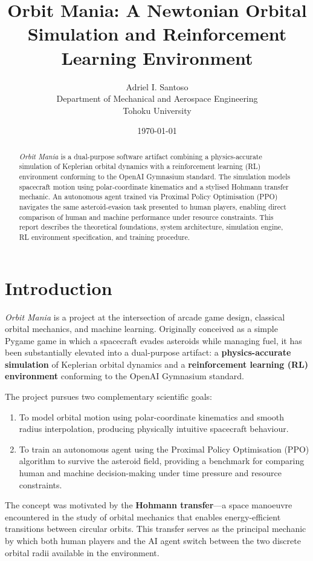 \documentclass[12pt]{article}
\title{Orbit Mania: A Newtonian Orbital Simulation and Reinforcement Learning Environment}
\author{
Adriel I. Santoso \\
Department of Mechanical and Aerospace Engineering \\
Tohoku University
}
\date{\today}
\begin{document}
\maketitle

\begin{abstract}
    \textit{Orbit Mania} is a dual-purpose software artifact combining a physics-accurate simulation of Keplerian orbital dynamics with a reinforcement learning (RL) environment conforming to the OpenAI Gymnasium standard. The simulation models spacecraft motion using polar-coordinate kinematics and a stylised Hohmann transfer mechanic. An autonomous agent trained via Proximal Policy Optimisation (PPO) navigates the same asteroid-evasion task presented to human players, enabling direct comparison of human and machine performance under resource constraints. This report describes the theoretical foundations, system architecture, simulation engine, RL environment specification, and training procedure.
\end{abstract}

\section{Introduction}

\textit{Orbit Mania} is a project at the intersection of arcade game design, classical orbital mechanics, and machine learning. Originally conceived as a simple Pygame game in which a spacecraft evades asteroids while managing fuel, it has been substantially elevated into a dual-purpose artifact: a \textbf{physics-accurate simulation} of Keplerian orbital dynamics and a \textbf{reinforcement learning (RL) environment} conforming to the OpenAI Gymnasium standard.

The project pursues two complementary scientific goals:
\begin{enumerate}
    \item To model orbital motion using polar-coordinate kinematics and smooth radius interpolation, producing physically intuitive spacecraft behaviour.
    \item To train an autonomous agent using the Proximal Policy Optimisation (PPO) algorithm to survive the asteroid field, providing a benchmark for comparing human and machine decision-making under time pressure and resource constraints.
\end{enumerate}

The concept was motivated by the \textbf{Hohmann transfer}---a space manoeuvre encountered in the study of orbital mechanics that enables energy-efficient transitions between circular orbits. This transfer serves as the principal mechanic by which both human players and the AI agent switch between the two discrete orbital radii available in the environment.
\end{document}
